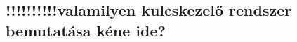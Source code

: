 \subsection{!!!!!!!!!!valamilyen kulcskezelő rendszer bemutatása kéne ide?}

























































































